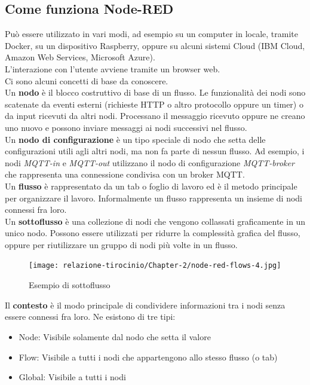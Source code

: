 \documentclass[a4paper,10pt]{memoir}
\begin{document}
\subsection{Come funziona Node-RED}
Può essere utilizzato in vari modi, ad esempio su un computer in locale, tramite Docker, su un dispositivo Raspberry, oppure su alcuni sistemi Cloud (IBM Cloud, Amazon Web Services, Microsoft Azure).
\\
L'interazione con l'utente avviene tramite un browser web. 
\\
Ci sono alcuni concetti di base da conoscere.
\\
Un \textbf{nodo} è il blocco costruttivo di base di un flusso. Le funzionalità dei nodi sono scatenate da eventi esterni (richieste HTTP o altro protocollo oppure un timer) o da input ricevuti da altri nodi. Processano il messaggio ricevuto oppure ne creano uno nuovo e possono inviare messaggi ai nodi successivi nel flusso. 
\\
Un \textbf{nodo di configurazione} è un tipo speciale di nodo che setta delle configurazioni utili agli altri nodi, ma non fa parte di nessun flusso. Ad esempio, i nodi \textit{MQTT-in} e \textit{MQTT-out} utilizzano il nodo di configurazione \textit{MQTT-broker} che rappresenta una connessione condivisa con un broker MQTT.
\\
Un \textbf{flusso} è rappresentato da un tab o foglio di lavoro ed è il metodo principale per organizzare il lavoro. Informalmente un flusso rappresenta un insieme di nodi connessi fra loro.
\\
Un \textbf{sottoflusso} è una collezione di nodi che vengono collassati graficamente in un unico nodo. Possono essere utilizzati per ridurre la complessità grafica del flusso, oppure per riutilizzare un gruppo di nodi più volte in un flusso.
\begin{figure}[H]
\caption{Esempio di sottoflusso}
\label{fig:sottoflusso}
\texttt{[image: relazione-tirocinio/Chapter-2/node-red-flows-4.jpg]}
\end{figure}
Il \textbf{contesto} è il modo principale di condividere informazioni tra i nodi senza essere connessi fra loro. Ne esistono di tre tipi:
\begin{itemize}
    \item Node: Visibile solamente dal nodo che setta il valore
    \item Flow: Visibile a tutti i nodi che appartengono allo stesso flusso (o tab)
    \item Global: Visibile a tutti i nodi
\end{itemize}
\end{document}
